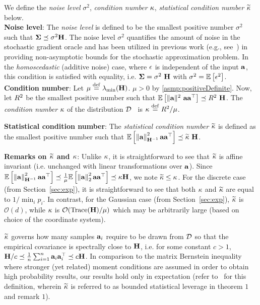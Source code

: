 \noindent We define the \emph{noise level} $\sigma^2$, \emph{condition number} ${\kappa}$, \emph{statistical condition number} $\widetilde{\kappa}$ below.\\
\noindent\textbf{Noise level}: The \emph{noise level} is defined to be the smallest positive number $\sigma^2$ such that $\mathbf{\Sigma}\preceq \sigma^2\mathbf{H}$.\iffalse\vspace*{-2mm}
\begin{align*}
\Sig\preceq\sigma^2\ \Cov.
\end{align*}\fi
The noise level $\sigma^2$ quantifies the amount of noise in the
stochastic gradient oracle and has been utilized in previous work (e.g., see~\cite{BachM11,BachM13}) in providing non-asymptotic bounds for the stochastic approximation problem. In the \emph{homoscedastic} (additive noise) case, where $\epsilon$ is independent of the input $\mathbf{a}$, this condition is satisfied with equality, i.e. $\mathbf{\Sigma} = \sigma^2\ \mathbf{H}$ with $\sigma^2 = \mathbb{E}\left[\epsilon^2\right]$.\\
\noindent\textbf{Condition number}: Let $\mu\stackrel{\mathrm{def}}{=}\lambda_{\textrm{min}}(\mathbf{H})$. $\mu>0$ by \ref{asmp:positiveDefinite}. Now, let $R^2$ be the smallest positive number such that $\E{\|\a\|^2\ \a\a\T} \preceq \infbound\ \Cov$. The \emph{condition number} ${\kappa}$ of the distribution $\mathcal{D}$~\citep{DefossezB15,JainKKNS16} is $
{\kappa} \stackrel{\mathrm{def}}{=} {R^2}/{\mu}$.

\noindent \textbf{Statistical condition number}: The \emph{statistical condition number} $\widetilde{\kappa}$ is defined as the smallest positive number such that $\E{\Hinvnorm{\a}^2\a\a\T}\preceq \cnS\ \Cov$. 

\noindent\textbf{Remarks on $\widetilde{\kappa}$ and ${\kappa}$}:
Unlike ${\kappa}$, it is straightforward to see that $\widetilde{\kappa}$ is affine invariant 
(i.e. unchanged with linear transformations over $\mathbf{a}$). 
Since $\mathbb{E}\left[\left\| \mathbf{a} \right\|_{\mathbf{H}^{-1}}^2\mathbf{a}\mathbf{a}^{\top}\right]\preceq \frac{1}{\mu}
\mathbb{E}\left[\left\| \mathbf{a} \right\|_2^2\mathbf{a}\mathbf{a}^{\top}\right]\preceq {\kappa} \mathbf{H}$, we note $\widetilde{\kappa} \leq {\kappa}$. For the discrete case
(from Section~\ref{sec:exp}), it is straightforward
to see that both ${\kappa}$ and $\widetilde{\kappa}$ are equal to $1/\min_i p_{i}$. In
contrast, for the Gaussian case (from Section~\ref{sec:exp}), $\widetilde{\kappa}$
 is $\mathcal{O}(d)$, while ${\kappa}$ is
 $\mathcal{O}(\textrm{Trace}(\mathbf{H})/\mu)$ which may be arbitrarily large (based on
 choice of the coordinate system).

$\widetilde{\kappa}$ governs how many samples $\mathbf{a}_{i}$ require to be drawn from $\mathcal{D}$ so
 that the empirical covariance is spectrally close to $\mathbf{H}$,
 i.e. for some constant $c>1$, $\mathbf{H}/c \preceq \frac{1}{n}\sum_{i=1}^n \mathbf{a}_i\mathbf{a}_i^{\top} \preceq c \mathbf{H}$.
 In comparison to the matrix Bernstein inequality where stronger (yet related) moment
 conditions are assumed in order to obtain high probability results,
 our results hold only in expectation (refer to~\citet{HsuKZ14} for this definition, wherein $\widetilde{\kappa}$ is referred to as bounded statistical leverage in theorem $1$ and remark $1$).\vspace*{-2mm}
